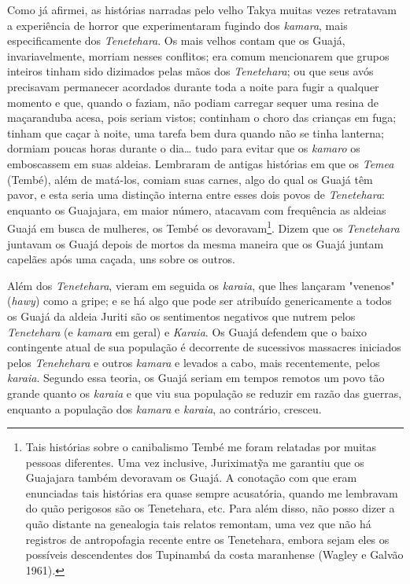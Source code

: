 Como já afirmei, as histórias narradas pelo velho Takya muitas vezes
retratavam a experiência de horror que experimentaram fugindo dos
\emph{kamara}, mais especificamente dos \emph{Tenetehara}. Os mais
velhos contam que os Guajá, invariavelmente, morriam nesses conflitos;
era comum mencionarem que grupos inteiros tinham sido dizimados pelas
mãos dos \emph{Tenetehara}; ou que seus avós precisavam permanecer
acordados durante toda a noite para fugir a qualquer momento e que,
quando o faziam, não podiam carregar sequer uma resina de maçaranduba
acesa, pois seriam vistos; continham o choro das crianças em fuga;
tinham que caçar à noite, uma tarefa bem dura quando não se tinha
lanterna; dormiam poucas horas durante o dia\ldots{} tudo para evitar que os
\emph{kamaro} os emboscassem em suas aldeias. Lembraram de antigas
histórias em que os \emph{Temea} (Tembé), além de matá-los, comiam suas
carnes, algo do qual os Guajá têm pavor, e esta seria uma distinção
interna entre esses dois povos de \emph{Tenetehara}: enquanto os
Guajajara, em maior número, atacavam com frequência as aldeias Guajá em
busca de mulheres, os Tembé os devoravam\footnote{Tais histórias sobre o
  canibalismo Tembé me foram relatadas por muitas pessoas diferentes.
  Uma vez inclusive, Juriximatỹa me garantiu que os Guajajara também
  devoravam os Guajá. A conotação com que eram enunciadas tais histórias
  era quase sempre acusatória, quando me lembravam do quão perigosos são
  os Tenetehara, etc. Para além disso, não posso dizer a quão distante
  na genealogia tais relatos remontam, uma vez que não há registros de
  antropofagia recente entre os Tenetehara, embora sejam eles os
  possíveis descendentes dos Tupinambá da costa maranhense (Wagley e
  Galvão 1961).}. Dizem que os \emph{Tenetehara} juntavam os Guajá
depois de mortos da mesma maneira que os Guajá juntam capelães após uma
caçada, uns sobre os outros.

Além dos \emph{Tenetehara}, vieram em seguida os \emph{karaia}, que lhes
lançaram "venenos" (\emph{hawy}) como a gripe; e se há algo que pode ser
atribuído genericamente a todos os Guajá da aldeia Juriti são os
sentimentos negativos que nutrem pelos \emph{Tenetehara} (e
\emph{kamara} em geral) e \emph{Karaia}. Os Guajá defendem que o baixo
contingente atual de sua população é decorrente de sucessivos massacres
iniciados pelos \emph{Tenehehara} e outros \emph{kamara} e levados a
cabo, mais recentemente, pelos \emph{karaia}. Segundo essa teoria, os
Guajá seriam em tempos remotos um povo tão grande quanto os
\emph{karaia} e que viu sua população se reduzir em razão das guerras,
enquanto a população dos \emph{kamara} e \emph{karaia}, ao contrário,
cresceu.

